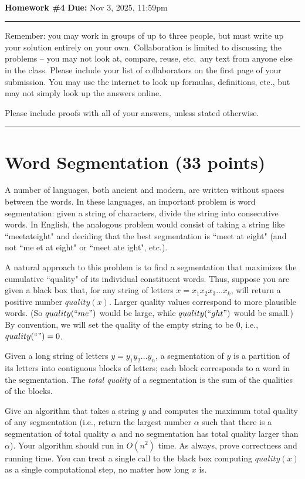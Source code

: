 \documentclass[11pt]{article}
\begin{document}
\\
{{\bf Homework \#4}} \hfill {{\bf Due:} Nov 3, 2025, 11:59pm} \\
\rule[0.1in]{\textwidth}{0.4pt}

Remember: you may work in groups of up to three people, but must write up your solution entirely on your own.  Collaboration is limited to discussing the problems -- you may not look at, compare, reuse, etc.~any text from anyone else in the class.  Please include your list of collaborators on the first page of your submission.  You may use the internet to look up formulas, definitions, etc., but may not simply look up the answers online.  

Please include proofs with all of your answers, unless stated otherwise.

\noindent \rule[0.1in]{\textwidth}{0.4pt}

\section{Word Segmentation (33 points)}
A number of languages, both ancient and modern, are written without spaces between the words.  In these languages, an important problem is word segmentation: given a string of characters, divide the string into consecutive words.  In English, the analogous problem would consist of taking a string like ``meetateight" and deciding that the best segmentation is ``meet at eight" (and not ``me et at eight" or ``meet ate ight", etc.).  

A natural approach to this problem is to find a segmentation that maximizes the cumulative ``quality"  of its individual constituent words.  Thus, suppose you are given a black box that, for any string of letters $x = x_1 x_2 x_3 \dots x_k$, will return a positive number $quality(x)$.  Larger quality values correspond to more plausible words.  (So $quality(``me")$ would be large, while $quality(``ght")$ would be small.)  By convention, we will set the quality of the empty string to be $0$, i.e., $quality(``")=0$.

Given a long string of letters $y = y_1 y_2 \dots y_n$, a segmentation of $y$ is a partition of its letters into contiguous blocks of letters; each block corresponds to a word in the segmentation.  The \emph{total quality} of a segmentation is the sum of the qualities of the blocks.  

Give an algorithm that takes a string $y$ and computes the maximum total quality of any segmentation (i.e., return the largest number $\alpha$ such that there is a segmentation of total quality $\alpha$ and no segmentation has total quality larger than $\alpha$).  Your algorithm should run in $O(n^2)$ time.  As always, prove correctness and running time.  You can treat a single call to the black box computing $quality(x)$ as a single computational step, no matter how long $x$ is.  
\end{document}

